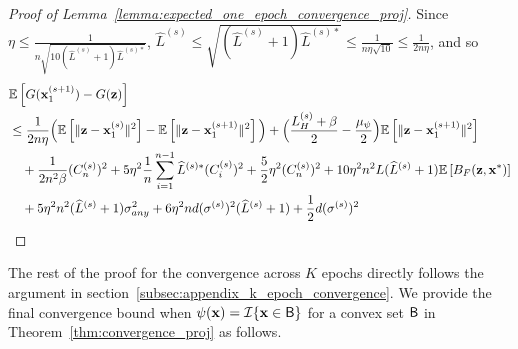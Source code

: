 \begin{proof}[Proof of Lemma~\ref{lemma:expected_one_epoch_convergence_proj}]
Since $\eta \leq \frac{1}{n\sqrt{10 (\widehat{L}^{(s)} + 1)\widehat{L}^{(s)*}}}$, $\widehat{L}^{(s)}\leq \sqrt{(\widehat{L}^{(s)} + 1) \widehat{L}^{(s)*}} \leq \frac{1}{n \eta \sqrt{10}} \leq \frac{1}{2n\eta}$, and so
\begin{align}
    &\mathbb{E}\left[G({\mathbf{x}}_1^{(s+1)}) - G({\mathbf{z}})\right]\\
    \nonumber
    &\leq \frac{1}{2n\eta}\Big(\mathbb{E}\left[\|{\mathbf{z}} - {\mathbf{x}}_1^{(s)}\|^2 \right] - \mathbb{E}\left[\| {\mathbf{z}} - {\mathbf{x}}_1^{(s+1)}\|^2 \right] \Big)
    + \Big( \frac{L_H^{(s)} + \beta}{2} - \frac{\mu_{\psi}}{2} \Big) \mathbb{E}\left[\| {\mathbf{z}} - {\mathbf{x}}_1^{(s+1)}\|^2 \right] \\
    \nonumber
    &\quad
    + \frac{1}{2n^2 \beta}(C_n^{(s)})^2
    + 5\eta^2 \frac{1}{n}\sum_{i=1}^{n-1} \widehat{L}^{(s)*} (C_i^{(s)})^2
    + \frac{5}{2}\eta^2 (C_n^{(s)})^2
    + 10 \eta^2 n^2 L (\widehat{L}^{(s)} + 1) \mathbb{E}\left[B_F({\mathbf{z}}, {\mathbf{x}}^*)\right]\\
    \nonumber
    &\quad + 5\eta^2 n^2 (\widehat{L}^{(s)} +1) \sigma_{any}^2 + 6 \eta^2 nd (\sigma^{(s)})^2 (\widehat{L}^{(s)}+1)
    + \frac{1}{2}d (\sigma^{(s)})^2
\end{align}




\end{proof}



The rest of the proof for the convergence across $K$ epochs directly follows the argument in section~\ref{subsec:appendix_k_epoch_convergence}. We provide the final convergence bound when $\psi({\mathbf{x}}) = {\mathcal{I}}\{{\mathbf{x}} \in {\mathsf{B}}\}$ for a convex set ${\mathsf{B}}$ in Theorem~\ref{thm:convergence_proj} as follows.



